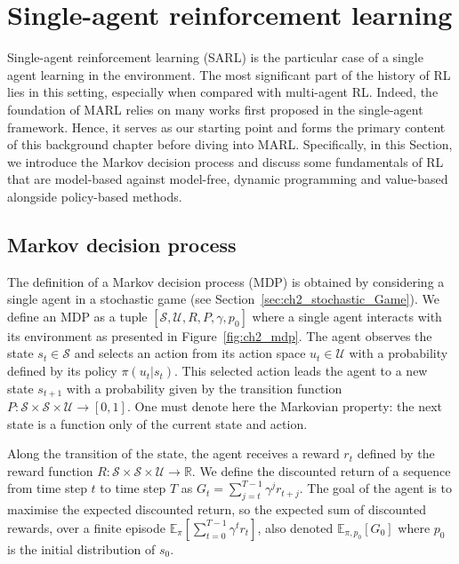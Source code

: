 \section{Single-agent reinforcement learning} 
\label{sec:ch2_single_agent_RL}
Single-agent reinforcement learning (SARL) is the particular case of a single agent learning in the environment.
The most significant part of the history of RL lies in this setting, especially when compared with multi-agent RL.
Indeed, the foundation of MARL relies on many works first proposed in the single-agent framework.
Hence, it serves as our starting point and forms the primary content of this background chapter before diving into MARL.
Specifically, in this Section, we introduce the Markov decision process and discuss some fundamentals of RL that are model-based against model-free, dynamic programming and value-based alongside policy-based methods.

\subsection{Markov decision process}
\label{sec:ch2_mdp}

The definition of a Markov decision process (MDP) is obtained by considering a single agent in a stochastic game (see Section~\ref{sec:ch2_stochastic_Game}).
We define an MDP as a tuple $[\mathcal{S}, \mathcal{U}, R, P, \gamma, p_0]$ where a single agent interacts with its environment as presented in Figure~\ref{fig:ch2_mdp}.
The agent observes the state $s_t \in \mathcal{S}$ and selects an action from its action space $u_t \in \mathcal{U}$ with a probability defined by its policy $\pi(u_t|s_t)$.
This selected action leads the agent to a new state $s_{t+1}$ with a probability given by the transition function $P:\mathcal{S} \times \mathcal{S} \times \mathcal{U} \rightarrow [0,1]$.
One must denote here the Markovian property: the next state is a function only of the current state and action.

Along the transition of the state, the agent receives a reward $r_t$ defined by the reward function $R:\mathcal{S} \times \mathcal{S} \times \mathcal{U} \rightarrow \mathbb{R}$.
We define the discounted return of a sequence from time step $t$ to time step $T$ as $G_t= \sum_{j=t}^{T-1} \gamma^j r_{t+j}$.
The goal of the agent is to maximise the expected discounted return, so the expected sum of discounted rewards, over a finite episode $\mathbb{E}_{\pi} \left[\sum_{t=0}^{T-1} \gamma^t r_t \right]$, also denoted $\mathbb{E}_{\pi, p_0}\left[ G_0 \right]$ where $p_0$ is the initial distribution of $s_0$.


